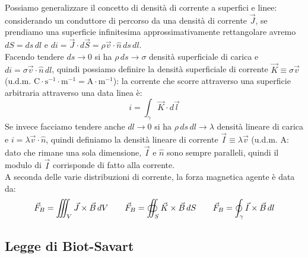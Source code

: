 Possiamo generalizzare il concetto di densità di corrente a superfici e linee: considerando un conduttore di percorso da una densità di corrente $ \vec{J} $, se prendiamo una superficie infinitesima approssimativamente rettangolare avremo $ dS = ds \, dl $ e $ di = \vec{J}\cdot d\vec{S} = \rho \vec{v}\cdot\hat{n} \, ds \, dl $. \\ 
%
Facendo tendere $ ds \rightarrow 0 $ si ha $ \rho \, ds \rightarrow \sigma $ densità superficiale di carica e $ di = \sigma \vec{v} \cdot \hat{n} \, dl $, quindi possiamo definire la densità superficiale di corrente $ \vec{K} \equiv \sigma\vec{v} $ (u.d.m. $ \text{C} \cdot \text{s}^{-1} \cdot \text{m}^{-1} = \text{A}  \cdot \text{m}^{-1} $): la corrente che scorre attraverso una superficie arbitraria attraverso una data linea è:
\begin{equation}
	i = \int_{\gamma} \vec{K}\cdot d\vec{l}
	\label{eq:dens-sup-corr}
\end{equation}
%
Se invece facciamo tendere anche $ dl \rightarrow 0 $ si ha $ \rho \, ds \, dl \rightarrow \lambda $ densità lineare di carica e $ i = \lambda \vec{v} \cdot \hat{n} $, quindi definiamo la densità lineare di corrente $ \vec{I} \equiv \lambda \vec{v} $ (u.d.m. $ \text{A} $: dato che rimane una sola dimensione, $ \vec{I} $ e $ \hat{n} $ sono sempre paralleli, quindi il modulo di $ \vec{I} $ corrisponde di fatto alla corrente. \\ 
%
A seconda delle varie distribuzioni di corrente, la forza magnetica agente è data da:
\begin{equation}
	\vec{F}_B = \iiint_V \vec{J}\times\vec{B} \, dV \qquad \vec{F}_B = \oiint_S \vec{K}\times\vec{B} \, dS \qquad \vec{F}_B = \oint_{\gamma} \vec{I}\times\vec{B} \, dl
	\label{eq:distr-corr}
\end{equation}

\subsection{Legge di Biot-Savart}

